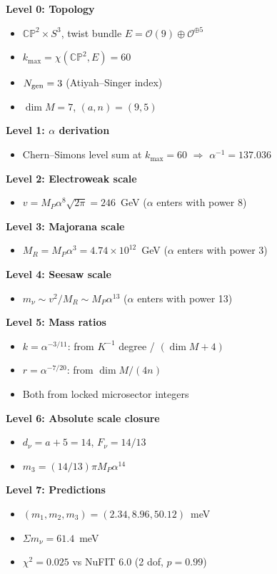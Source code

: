 \documentclass[11pt,a4paper]{article}
\begin{document}
\begin{tcolorbox}[colback=green!5!white, colframe=green!60!black,
  title=\textbf{$\alpha$ $\to$ Neutrino Connection Map}]

\textbf{Level 0: Topology}
\begin{itemize}[nosep]
\item $\mathbb{CP}^2 \times S^3$, twist bundle
  $E = \mathcal{O}(9) \oplus \mathcal{O}^{\oplus 5}$
\item $k_{\max} = \chi(\mathbb{CP}^2, E) = 60$
\item $N_{\rm gen} = 3$ (Atiyah--Singer index)
\item $\dim M = 7$, $(a, n) = (9, 5)$
\end{itemize}

\textbf{Level 1: $\alpha$ derivation}
\begin{itemize}[nosep]
\item Chern--Simons level sum at $k_{\max} = 60$ $\Rightarrow$
  $\alpha^{-1} = 137.036$
\end{itemize}

\textbf{Level 2: Electroweak scale}
\begin{itemize}[nosep]
\item $v = M_P \alpha^8 \sqrt{2\pi} = 246$~GeV ($\alpha$ enters with
  power 8)
\end{itemize}

\textbf{Level 3: Majorana scale}
\begin{itemize}[nosep]
\item $M_R = M_P \alpha^3 = 4.74 \times 10^{12}$~GeV ($\alpha$ enters
  with power 3)
\end{itemize}

\textbf{Level 4: Seesaw scale}
\begin{itemize}[nosep]
\item $m_\nu \sim v^2/M_R \sim M_P \alpha^{13}$ ($\alpha$ enters with
  power 13)
\end{itemize}

\textbf{Level 5: Mass ratios}
\begin{itemize}[nosep]
\item $k = \alpha^{-3/11}$: from $K^{-1}$ degree / $(\dim M + 4)$
\item $r = \alpha^{-7/20}$: from $\dim M / (4n)$
\item Both from locked microsector integers
\end{itemize}

\textbf{Level 6: Absolute scale closure}
\begin{itemize}[nosep]
\item $d_\nu = a + 5 = 14$, $F_\nu = 14/13$
\item $m_3 = (14/13)\pi M_P \alpha^{14}$
\end{itemize}

\textbf{Level 7: Predictions}
\begin{itemize}[nosep]
\item $(m_1, m_2, m_3) = (2.34, 8.96, 50.12)$~meV
\item $\Sigma m_\nu = 61.4$~meV
\item $\chi^2 = 0.025$ vs NuFIT 6.0 (2 dof, $p = 0.99$)
\end{itemize}
\end{tcolorbox}
\end{document}
